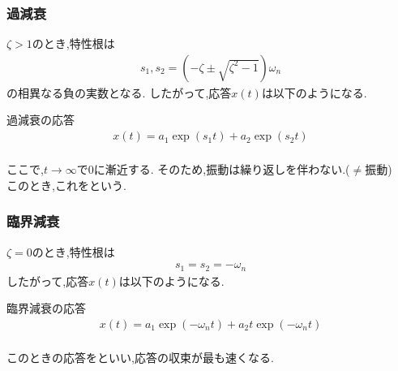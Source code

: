 \documentclass[a4paper]{jsarticle}
\begin{document}
\subsubsection{過減衰}
$\zeta>1$のとき,特性根は
\begin{eqnarray*}
    s_1,s_2=\left(-\zeta \pm \sqrt{\zeta^2-1}\right)\omega_n
\end{eqnarray*}
の相異なる負の実数となる.
したがって,応答$x\left(t\right)$は以下のようになる.
\begin{itembox}[l]{過減衰の応答}
    \begin{eqnarray*}
        x\left(t\right)=a_1\exp{\left(s_1t\right)}+a_2\exp{\left(s_2t\right)}\\
    \end{eqnarray*}
\end{itembox}
ここで,$t\rightarrow\infty$で$0$に漸近する.
そのため,振動は繰り返しを伴わない.($\neq$振動)\\
このとき,これをという.
\subsubsection{臨界減衰}
$\zeta = 0$のとき,特性根は
\begin{eqnarray*}
    s_1=s_2=-\omega_n
\end{eqnarray*}
したがって,応答$x\left(t\right)$は以下のようになる.
\begin{itembox}[l]{臨界減衰の応答}
    \begin{eqnarray*}
        x\left(t\right)=a_1\exp{\left(-\omega_nt\right)}+a_2t\exp{\left(-\omega_nt\right)}\\
    \end{eqnarray*}
\end{itembox}
このときの応答をといい,応答の収束が最も速くなる.
\end{document}
